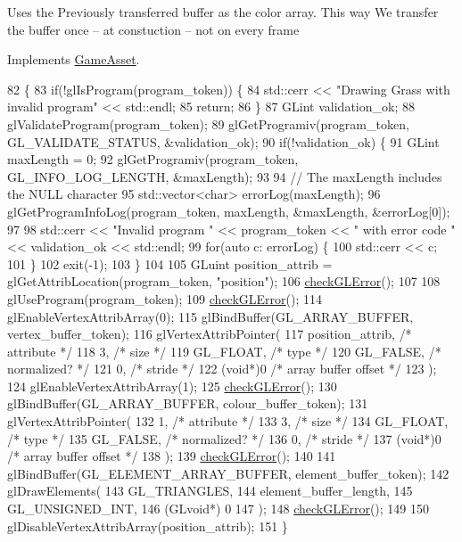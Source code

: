 Uses the Previously transferred buffer as the color array. This way We transfer the buffer once -- at constuction -- not on every frame

Implements \hyperlink{classGameAsset_a961aa51ca0a9961fc584c0b5d5431300}{Game\+Asset}.


\begin{DoxyCode}
82                                           \{
83   \textcolor{keywordflow}{if}(!glIsProgram(program\_token)) \{
84     std::cerr << \textcolor{stringliteral}{"Drawing Grass with invalid program"} << std::endl;
85     \textcolor{keywordflow}{return};
86   \}
87   GLint validation\_ok;
88   glValidateProgram(program\_token);
89   glGetProgramiv(program\_token, GL\_VALIDATE\_STATUS, &validation\_ok);
90   \textcolor{keywordflow}{if}(!validation\_ok) \{
91     GLint maxLength = 0;
92     glGetProgramiv(program\_token, GL\_INFO\_LOG\_LENGTH, &maxLength);
93 
94     \textcolor{comment}{// The maxLength includes the NULL character}
95     std::vector<char> errorLog(maxLength);
96     glGetProgramInfoLog(program\_token, maxLength, &maxLength, &errorLog[0]);
97 
98     std::cerr << \textcolor{stringliteral}{"Invalid program "} << program\_token << \textcolor{stringliteral}{" with error code "} << validation\_ok << std::endl;
99     \textcolor{keywordflow}{for}(\textcolor{keyword}{auto} c: errorLog) \{
100       std::cerr << c;
101     \}
102     exit(-1);
103   \}
104 
105   GLuint position\_attrib = glGetAttribLocation(program\_token, \textcolor{stringliteral}{"position"});
106   \hyperlink{GrassAsset_8cc_a75f201b0e53e68726854997957322b8d}{checkGLError}();
107 
108   glUseProgram(program\_token);
109   \hyperlink{GrassAsset_8cc_a75f201b0e53e68726854997957322b8d}{checkGLError}();
114   glEnableVertexAttribArray(0);
115   glBindBuffer(GL\_ARRAY\_BUFFER, vertex\_buffer\_token);
116   glVertexAttribPointer(
117     position\_attrib,        \textcolor{comment}{/* attribute */}
118     3,        \textcolor{comment}{/* size */}
119     GL\_FLOAT,   \textcolor{comment}{/* type */}
120     GL\_FALSE,   \textcolor{comment}{/* normalized? */}
121     0,        \textcolor{comment}{/* stride */}
122     (\textcolor{keywordtype}{void}*)0    \textcolor{comment}{/* array buffer offset */}
123   );
124   glEnableVertexAttribArray(1);
125   \hyperlink{GrassAsset_8cc_a75f201b0e53e68726854997957322b8d}{checkGLError}();
130   glBindBuffer(GL\_ARRAY\_BUFFER, colour\_buffer\_token);
131   glVertexAttribPointer(
132     1,        \textcolor{comment}{/* attribute */}
133     3,        \textcolor{comment}{/* size */}
134     GL\_FLOAT,   \textcolor{comment}{/* type */}
135     GL\_FALSE,   \textcolor{comment}{/* normalized? */}
136     0,        \textcolor{comment}{/* stride */}
137     (\textcolor{keywordtype}{void}*)0    \textcolor{comment}{/* array buffer offset */}
138   );
139   \hyperlink{GrassAsset_8cc_a75f201b0e53e68726854997957322b8d}{checkGLError}();
140 
141   glBindBuffer(GL\_ELEMENT\_ARRAY\_BUFFER, element\_buffer\_token);
142   glDrawElements(
143     GL\_TRIANGLES,
144     element\_buffer\_length,
145     GL\_UNSIGNED\_INT,
146     (GLvoid*) 0
147   );
148   \hyperlink{GrassAsset_8cc_a75f201b0e53e68726854997957322b8d}{checkGLError}();
149 
150   glDisableVertexAttribArray(position\_attrib);
151 \}
\end{DoxyCode}


